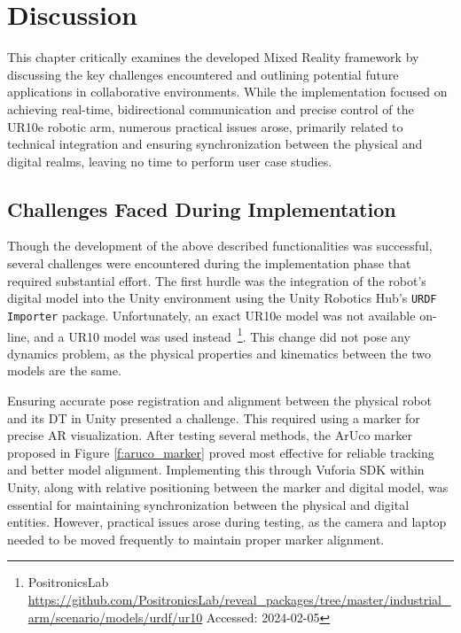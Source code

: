 \chapter{Discussion}

\begin{introduction}
    This chapter critically examines the developed Mixed Reality framework by discussing the key challenges encountered and outlining potential future applications in collaborative environments. While the implementation focused on achieving real-time, bidirectional communication and precise control of the UR10e robotic arm, numerous practical issues arose, primarily related to technical integration and ensuring synchronization between the physical and digital realms, leaving no time to perform user case studies.
\end{introduction}


\section{Challenges Faced During Implementation}
Though the development of the above described functionalities was successful, several challenges were encountered during the implementation phase that required substantial effort. The first hurdle was the integration of the robot’s digital model into the Unity environment using the Unity Robotics Hub's \texttt{URDF Importer} package. Unfortunately, an exact UR10e model was not available on-line, and a UR10 model was used instead~\footnote{PositronicsLab \url{https://github.com/PositronicsLab/reveal_packages/tree/master/industrial_arm/scenario/models/urdf/ur10} Accessed: 2024-02-05}. This change did not pose any dynamics problem, as the physical properties and kinematics between the two models are the same.

Ensuring accurate pose registration and alignment between the physical robot and its \ac{DT} in Unity presented a challenge. This required using a marker for precise \ac{AR} visualization. After testing several methods, the ArUco marker proposed in Figure \ref{f:aruco_marker} proved most effective for reliable tracking and better model alignment. Implementing this through Vuforia \ac{SDK} within Unity, along with relative positioning between the marker and digital model, was essential for maintaining synchronization between the physical and digital entities. However, practical issues arose during testing, as the camera and laptop needed to be moved frequently to maintain proper marker alignment.

